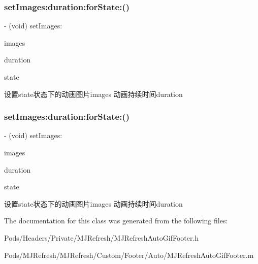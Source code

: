 \subsubsection{\texorpdfstring{set\+Images\+:duration\+:for\+State\+:()}{setImages:duration:forState:()}\hspace{0.1cm}{\footnotesize\ttfamily [2/3]}}
{\footnotesize\ttfamily -\/ (void) set\+Images\+: \begin{DoxyParamCaption}\item[{(N\+S\+Array $\ast$)}]{images }\item[{duration:(N\+S\+Time\+Interval)}]{duration }\item[{forState:(M\+J\+Refresh\+State)}]{state }\end{DoxyParamCaption}}

设置state状态下的动画图片images 动画持续时间duration \mbox{\label{interface_m_j_refresh_auto_gif_footer_ae025ecc73c92e89cf24c92b6a9e75730}} 
\subsubsection{\texorpdfstring{set\+Images\+:duration\+:for\+State\+:()}{setImages:duration:forState:()}\hspace{0.1cm}{\footnotesize\ttfamily [3/3]}}
{\footnotesize\ttfamily -\/ (void) set\+Images\+: \begin{DoxyParamCaption}\item[{(N\+S\+Array $\ast$)}]{images }\item[{duration:(N\+S\+Time\+Interval)}]{duration }\item[{forState:(M\+J\+Refresh\+State)}]{state }\end{DoxyParamCaption}}

设置state状态下的动画图片images 动画持续时间duration 

The documentation for this class was generated from the following files\+:\begin{DoxyCompactItemize}
\item 
Pods/\+Headers/\+Private/\+M\+J\+Refresh/M\+J\+Refresh\+Auto\+Gif\+Footer.\+h\item 
Pods/\+M\+J\+Refresh/\+M\+J\+Refresh/\+Custom/\+Footer/\+Auto/M\+J\+Refresh\+Auto\+Gif\+Footer.\+m\end{DoxyCompactItemize}
